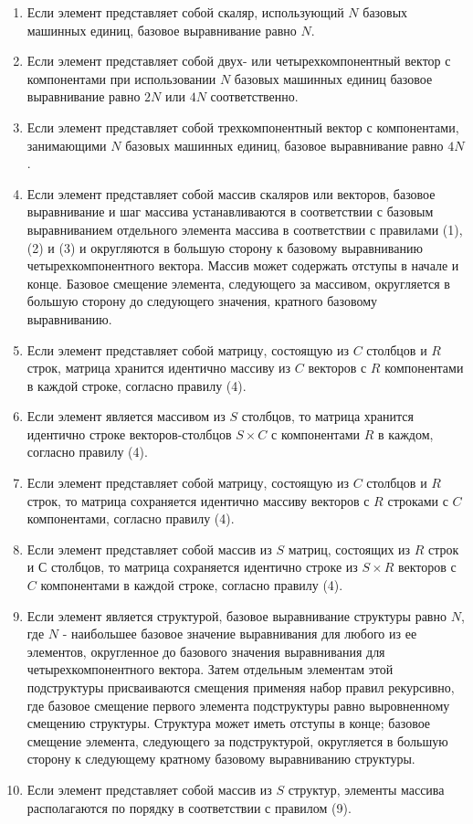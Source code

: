 \begin{enumerate}[label=\arabic*), labelsep=0.5em]
    \item Если элемент представляет собой скаляр, использующий \(N\) базовых машинных единиц,
    базовое выравнивание равно \(N\).
    \item Если элемент представляет собой двух- или четырехкомпонентный вектор с компонентами
    при использовании \(N\) базовых машинных единиц базовое выравнивание равно \(2N\) или
    \(4N\) соответственно.
    \item Если элемент представляет собой трехкомпонентный вектор с компонентами, занимающими
    \(N\) базовых машинных единиц, базовое выравнивание равно \(4N\).
    \item Если элемент представляет собой массив скаляров или векторов, базовое выравнивание
    и шаг массива устанавливаются в соответствии с базовым выравниванием отдельного элемента массива
    в соответствии с правилами (1), (2) и (3) и округляются в большую сторону
    к базовому выравниванию четырехкомпонентного вектора. Массив может содержать отступы в начале
    и конце. Базовое смещение элемента, следующего за массивом, округляется в большую сторону
    до следующего значения, кратного базовому выравниванию.
    \item Если элемент представляет собой матрицу, состоящую из \(C\) столбцов и \(R\)
    строк, матрица хранится идентично массиву из \(C\)
    векторов с \(R\) компонентами в каждой строке, согласно правилу (4).
    \item Если элемент является массивом из \(S\) столбцов, то матрица хранится идентично строке векторов-столбцов \(S \times C\) с
    компонентами \(R\) в каждом, согласно правилу (4).
    \item Если элемент представляет собой матрицу, состоящую из \(C\) столбцов и \(R\) строк,
    то матрица сохраняется идентично массиву векторов с \(R\) строками с \(C\) компонентами,
    согласно правилу (4).
    \item Если элемент представляет собой массив из \(S\) матриц, состоящих из \(R\) строк
    и \(С\) столбцов, то матрица сохраняется идентично строке из \(S \times R\)
    векторов с \(C\) компонентами в каждой строке, согласно правилу (4).
    \item Если элемент является структурой, базовое выравнивание структуры равно
    \(N\), где \(N\) - наибольшее базовое значение выравнивания для любого из ее элементов,
    округленное до базового значения выравнивания для четырехкомпонентного вектора. Затем отдельным
    элементам этой подструктуры присваиваются смещения применяя набор правил рекурсивно,
    где базовое смещение первого элемента подструктуры равно выровненному смещению структуры.
    Структура может иметь отступы в конце; базовое смещение элемента, следующего за подструктурой,
    округляется в большую сторону к следующему кратному базовому выравниванию структуры.
    \item Если элемент представляет собой массив из \(S\) структур, элементы
    массива располагаются по порядку в соответствии с правилом (9).
\end{enumerate}

